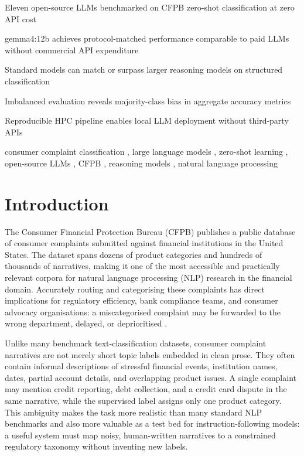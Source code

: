 \documentclass[a4paper,fleqn]{cas-dc}
\begin{document}
\begin{highlights}
\item Eleven open-source LLMs benchmarked on CFPB zero-shot classification at zero API cost
\item gemma4:12b achieves protocol-matched performance comparable to paid LLMs without commercial API expenditure
\item Standard models can match or surpass larger reasoning models on structured classification
\item Imbalanced evaluation reveals majority-class bias in aggregate accuracy metrics
\item Reproducible HPC pipeline enables local LLM deployment without third-party APIs
\end{highlights}

\begin{keywords}
consumer complaint classification \sep
large language models \sep
zero-shot learning \sep
open-source LLMs \sep
CFPB \sep
reasoning models \sep
natural language processing
\end{keywords}

\maketitle

\section{Introduction}
\label{sec:intro}

The Consumer Financial Protection Bureau (CFPB) publishes a public
database of consumer complaints submitted against financial institutions
in the United States. The dataset spans dozens of product categories
and hundreds of thousands of narratives, making it one of the most
accessible and practically relevant corpora for natural language
processing (NLP) research in the financial domain. Accurately routing
and categorising these complaints has direct implications for
regulatory efficiency, bank compliance teams, and consumer advocacy
organisations: a miscategorised complaint may be forwarded to the wrong
department, delayed, or deprioritised
\cite{das2024explainable,liu2024framework,jondhale2024cfpb}.

Unlike many benchmark text-classification datasets, consumer complaint
narratives are not merely short topic labels embedded in clean prose.
They often contain informal descriptions of stressful financial events,
institution names, dates, partial account details, and overlapping
product issues. A single complaint may mention credit reporting, debt
collection, and a credit card dispute in the same narrative, while the
supervised label assigns only one product category. This ambiguity makes
the task more realistic than many standard NLP benchmarks and also more
valuable as a test bed for instruction-following models: a useful system
must map noisy, human-written narratives to a constrained regulatory
taxonomy without inventing new labels.
\end{document}
